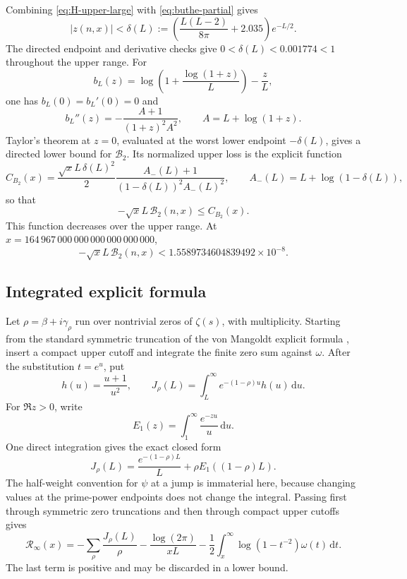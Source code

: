 \documentclass[11pt,a4paper]{article}
\numberwithin{equation}{section}
\theoremstyle{definition}
\newcommand{\Xmax}{164\,967\,000\,000\,000\,000\,000\,000}
\newcommand{\dd}{\,\mathrm{d}}
\newcommand{\Rinf}{\mathcal R_{\infty}}
\newcommand{\Btwo}{\mathcal B_{2}}
\begin{document}
Combining \eqref{eq:H-upper-large} with \eqref{eq:buthe-partial} gives
\[
  |z(n,x)|
  <
  \delta(L)
  :=
  \left(\frac{L(L-2)}{8\pi}+2.035\right)e^{-L/2}.
\]
The directed endpoint and derivative checks give
\(0<\delta(L)<0.001774<1\) throughout the upper range.
For
\[
  b_L(z)
  =
  \log\left(1+\frac{\log(1+z)}L\right)-\frac zL,
\]
one has \(b_L(0)=b_L'(0)=0\) and
\[
  b_L''(z)
  =
  -\frac{A+1}{(1+z)^2A^2},
  \qquad
  A=L+\log(1+z).
\]
Taylor's theorem at \(z=0\), evaluated at the worst lower endpoint
\(-\delta(L)\), gives a directed lower bound for \(\Btwo\).  Its normalized
upper loss is the explicit function
\begin{equation}\label{eq:CB2-def}
  C_{B_2}(x)
  =
  \frac{\sqrt{x}L\,\delta(L)^2}{2}
  \frac{A_-(L)+1}{(1-\delta(L))^2A_-(L)^2},
  \qquad
  A_-(L)=L+\log(1-\delta(L)),
\end{equation}
so that
\[
  -\sqrt{x}L\,\Btwo(n,x)\le C_{B_2}(x).
\]
This function decreases over the upper range.  At \(x=\Xmax\),
\begin{equation}\label{eq:B2-endpoint}
  -\sqrt{x}L\,\Btwo(n,x)
  <
  1.5589734604839492\times10^{-8}.
\end{equation}

\subsection{Integrated explicit formula}\label{sec:explicit-formula}

Let \(\rho=\beta+i\gamma_\rho\) run over nontrivial zeros of
\(\zeta(s)\), with multiplicity.  Starting from the standard symmetric
truncation of the von Mangoldt explicit formula
\cite[Ch.~17]{titchmarsh1986}, insert a compact upper cutoff and integrate the
finite zero sum against \(\omega\).  After the substitution \(t=e^u\), put
\[
  h(u)=\frac{u+1}{u^2},
  \qquad
  J_\rho(L)
  =
  \int_L^\infty e^{-(1-\rho)u}h(u)\dd u.
\]
For \(\Re z>0\), write
\[
  E_1(z)=\int_1^\infty\frac{e^{-zu}}u\dd u.
\]
One direct integration gives the exact closed form
\begin{equation}\label{eq:Jrho-E1}
  \boxed{
  J_\rho(L)
  =\frac{e^{-(1-\rho)L}}L
  +\rho E_1((1-\rho)L).
  }
\end{equation}
The half-weight convention for \(\psi\) at a jump is immaterial here, because
changing values at the prime-power endpoints does not change the integral.
Passing first through symmetric zero truncations and then through compact
upper cutoffs gives
\begin{equation}\label{eq:integrated-explicit}
  \Rinf(x)
  =
  -\sum_\rho\frac{J_\rho(L)}{\rho}
  -\frac{\log(2\pi)}{xL}
  -\frac12\int_x^\infty
  \log(1-t^{-2})\omega(t)\dd t.
\end{equation}
The last term is positive and may be discarded in a lower bound.
\end{document}
